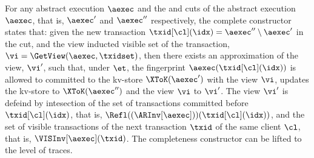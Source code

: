 For any abstract execution \( \aexec \)
and the  and  cuts of the abstract execution \( \aexec \), 
that is, \( \aexec'\) and \( \aexec'' \) respectively,
the complete constructor states that: 
given the new transaction \( \txid[\cl](\idx) = \aexec'' \setminus \aexec' \) in the  cut,
and the view inducted visible set of the transaction, \( \vi = \GetView(\aexec,\txidset) \),
then there exists an approximation of the view, \( \vi' \), such that, under \( \et \), 
the fingerprint \( \aexec(\txid[\cl](\idx)) \) is allowed to committed to the kv-store \( \XToK(\aexec') \)
with the view \( \vi \), updates the kv-store to \( \XToK(\aexec'') \) and the view \( \vi \) to \( \vi' \).
The view \( \vi' \) is defeind by intesection of the set of transactions  committed before \(  \txid[\cl](\idx) \),
that is, \( \Refl((\ARInv[\aexec]))(\txid[\cl](\idx)) \),
and the set of visible transactions of the next transaction \( \txid \) of the same client \(\cl \),
that is, \(\VISInv[\aexec](\txid) \).
The completeness constructor can be lifted to the level of traces.

